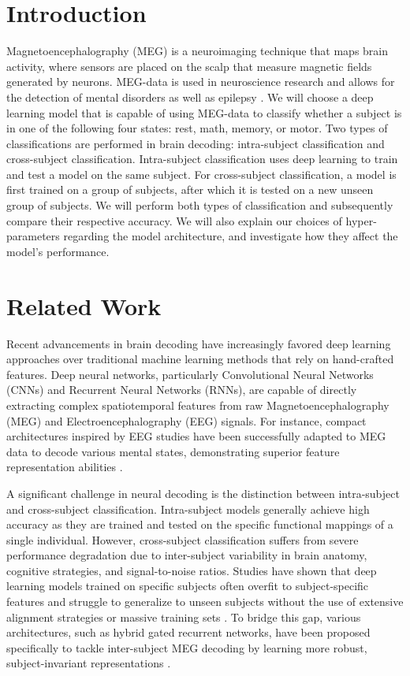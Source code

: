 \documentclass[conference]{IEEEtran}
\begin{document}
\section{Introduction}
Magnetoencephalography (MEG) is a neuroimaging technique that maps brain activity, where sensors are placed on the scalp that measure magnetic fields generated by neurons.
MEG-data is used in neuroscience research and allows for the detection of mental disorders as well as epilepsy \cite{hamalainen1993magnetoencephalography}.
We will choose a deep learning model that is capable of using MEG-data to classify whether a subject is in one of the following four states: rest, math, memory, or motor.
Two types of classifications are performed in brain decoding: intra-subject classification and cross-subject classification.
Intra-subject classification uses deep learning to train and test a model on the same subject.
For cross-subject classification, a model is first trained on a group of subjects, after which it is tested on a new unseen group of subjects.
We will perform both types of classification and subsequently compare their respective accuracy.
We will also explain our choices of hyper-parameters regarding the model architecture, and investigate how they affect the model's performance.

\section{Related Work}
Recent advancements in brain decoding have increasingly favored deep learning approaches over traditional machine learning methods that rely on hand-crafted features.
Deep neural networks, particularly Convolutional Neural Networks (CNNs) and Recurrent Neural Networks (RNNs), are capable of directly extracting complex spatiotemporal features from raw Magnetoencephalography (MEG) and Electroencephalography (EEG) signals.
For instance, compact architectures inspired by EEG studies have been successfully adapted to MEG data to decode various mental states, demonstrating superior feature representation abilities \cite{Raza2023}.

A significant challenge in neural decoding is the distinction between intra-subject and cross-subject classification.
Intra-subject models generally achieve high accuracy as they are trained and tested on the specific functional mappings of a single individual.
However, cross-subject classification suffers from severe performance degradation due to inter-subject variability in brain anatomy, cognitive strategies, and signal-to-noise ratios.
Studies have shown that deep learning models trained on specific subjects often overfit to subject-specific features and struggle to generalize to unseen subjects without the use of extensive alignment strategies or massive training sets \cite{Frontiers2020}.
To bridge this gap, various architectures, such as hybrid gated recurrent networks, have been proposed specifically to tackle inter-subject MEG decoding by learning more robust, subject-invariant representations \cite{Li2021}.
\end{document}
